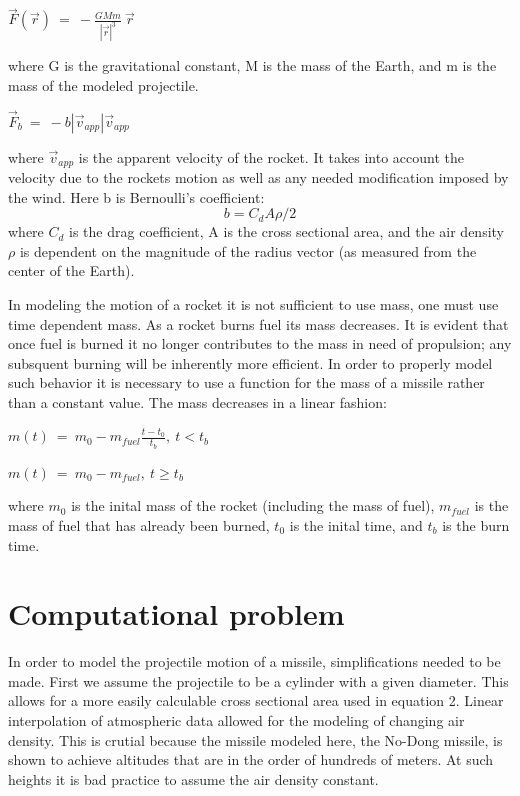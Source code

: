 \documentclass[11pt]{article}
\begin{document}
\begin{center}
$\vec{F}(\vec{r}) ~=~ -\frac{GMm}{\left |
                    \vec{r}\right|^3} ~ \vec{r}$
\end{center}
where G is the gravitational constant, M is the mass of the Earth, and m is the mass of the modeled 
projectile.
\begin{center}
 $\vec{F}_b ~=~ -b\left
                            |\vec{v}_{app}\right | \vec{v}_{app}$
\end{center}
where $\vec{v}_{app}$ is the apparent velocity of the rocket.  It takes into account the velocity due to 
the rockets motion as well as any needed modification imposed by the wind.  
Here b is Bernoulli's coefficient:
\begin{equation}
\label{dragconst}
 b = C_d A \rho / 2
\end{equation}
where $C_{d}$ is the drag coefficient, A is the cross sectional area, and the air density $\rho$ is 
dependent on the magnitude of the radius vector (as measured from the center of the Earth).



In modeling the 
motion of a rocket it is not sufficient to use mass, one must use time dependent mass.  As a rocket 
burns fuel its mass decreases.  It is evident that once fuel is burned it no longer contributes to the 
mass in need of propulsion; any subsquent burning will be inherently more efficient.  In order to properly 
model such behavior it is necessary to use a function for the mass of a missile rather than a constant 
value.  The mass decreases in a linear fashion:
\begin{center}
 $m(t) ~=~ m_0 - m_{fuel} \frac{t-t_0}{t_b}, ~
                        t<t_b$
\end{center}
\begin{center}
 $m(t) ~=~ m_0 - m_{fuel}, ~ t\geq t_b$
\end{center}
where $m_{0}$ is the inital mass of the rocket (including the mass of fuel), $m_{fuel}$ is the 
mass of fuel that has already been burned, $t_{0}$ is the inital time, and $t_{b}$ is the burn time.

\section{Computational problem}

In order to model the projectile motion of a missile, simplifications needed to be made.  First we assume
the projectile to be a cylinder with a given diameter.  This allows for a more easily calculable cross sectional 
area used in equation 2.
Linear interpolation 
of atmospheric data allowed for the modeling of changing air density.  This is crutial because the missile 
modeled here, the No-Dong missile, is shown to achieve altitudes that are in the order of hundreds of meters.  
At such heights it is bad practice to assume the air density constant.
\end{document}

